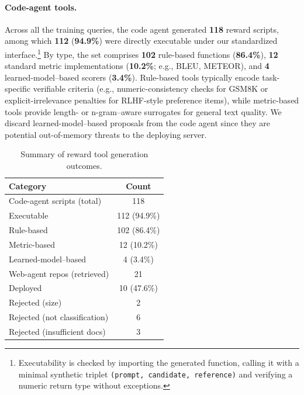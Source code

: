 \paragraph{Code-agent tools.} 
Across all the training queries, the code agent generated \textbf{118} reward scripts, among which \textbf{112} (\textbf{94.9\%}) were directly executable under our standardized interface.\footnote{Executability is checked by importing the generated function, calling it with a minimal synthetic triplet \texttt{(prompt, candidate, reference)} and verifying a numeric return type without exceptions.}
By type, the set comprises \textbf{102} rule-based functions (\textbf{86.4\%}), \textbf{12} standard metric implementations (\textbf{10.2\%}; e.g., BLEU, METEOR), and \textbf{4} learned-model–based scorers (\textbf{3.4\%}).
Rule-based tools typically encode task-specific verifiable criteria (e.g., numeric-consistency checks for \textsc{GSM8K} or explicit-irrelevance penalties for RLHF-style preference items), while metric-based tools provide length- or n-gram–aware surrogates for general text quality.
We discard learned-model–based proposals from the code agent since they are potential out-of-memory threats to the deploying server.

\begin{table}[t]
    \centering
    \caption{Summary of reward tool generation outcomes.}
    \label{tab:tool_gen_quality}
    \begin{tabular}{lc}
    \toprule
    \textbf{Category} & \textbf{Count} \\
    \midrule
    Code-agent scripts (total) & 118 \\
    \quad Executable & 112 (94.9\%)  \\
    \quad Rule-based & 102 (86.4\%) \\
    \quad Metric-based & 12 (10.2\%) \\
    \quad Learned-model–based & 4 (3.4\%) \\
    \midrule
    Web-agent repos (retrieved) & 21 \\
    \quad Deployed & 10 (47.6\%) \\
    \quad Rejected (size) & 2 \\
    \quad Rejected (not classification) & 6 \\
    \quad Rejected (insufficient docs) & 3  \\
    \bottomrule
    \end{tabular}
\end{table}

